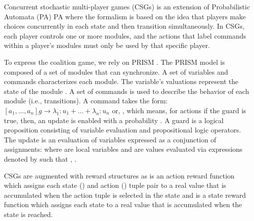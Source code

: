 Concurrent stochastic multi-player games (CSGs) \cite{Kwiatkowska2019,Kwiatkowska2020} is an extension of Probabilistic Automata (PA) PA \cite{ref27}  where the formalism is based on the idea that players make choices concurrently in each state and then transition simultaneously. In CSGs, each player controls one or more modules, and the actions that label commands within a player's modules must only be used by that specific player. 

To express the coalition game, we rely on PRISM \cite{Kwiatkowskaprism2011}. The PRISM model is composed of a set of modules that can synchronize. A set of variables and commands characterizes each module. The variable's valuations represent the state of the module . A set of commands is used to describe the behavior of each module (i.e., transitions). A command takes the form: $ [a_{1}, \ldots, a_{n}] g \rightarrow \lambda_{1}: u_{1} + \ldots+ \lambda_{n}: u_{n} $ or, , which means, for actions   if the guard  is true, then, an update  is enabled with a probability . A guard is a logical proposition consisting of variable evaluation and propositional logic operators. The update  is an evaluation of variables expressed as a conjunction of assignments:  where   are local variables and  are values evaluated via expressions denoted by \quot{\emath{\theta}} such that , . 

CSGs are augmented with reward structures \cite{Kwiatkowska2019,Kwiatkowska2020}  as  is an action reward function which assigns each state () and action () tuple pair to a real value that is accumulated when the action tuple is selected in the state and   is a state reward function which assigns each state to a real value that is accumulated when the state is reached.


